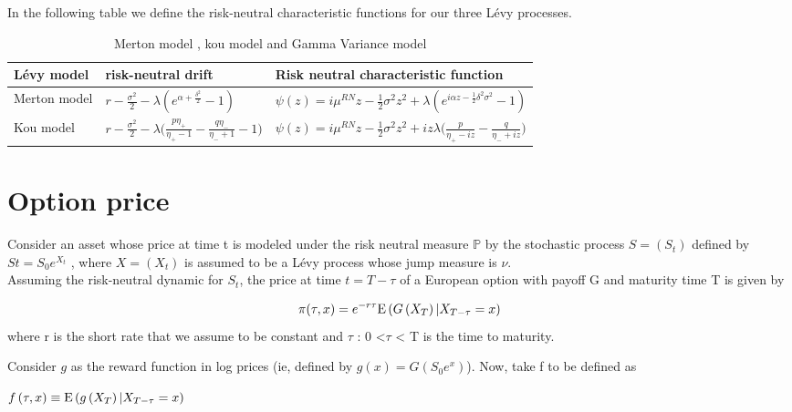 \documentclass[12pt]{report}
\begin{document}
In the following table we define the risk-neutral characteristic functions for our three Lévy processes.
\begin {table}[h!]
\begin{center}
\renewcommand{\arraystretch}{2}
\begin{tabular}{|l|l|l|}
 \hline
   Lévy model  & risk-neutral drift & Risk neutral characteristic function   \\
 \hline
Merton model  & $r-\frac{\sigma^2}{2}-\lambda (e^{\alpha+\frac{\delta^2}{2}}-1)$ & $\psi (z)= i\mu^{RN}z - \frac{1}{2}\sigma^2  z^2 + \lambda (e^{i \alpha z - \frac{1}{2} \delta ^2 \sigma^2}-1)$  \\
 \hline
 Kou model  & $r-\frac{\sigma^2}{2}-\lambda \big(\frac{p \eta_+}{\eta_+ -1}-\frac{q \eta_-}{\eta_- + 1}-1\big)$ & $\psi (z)= i\mu^{RN}z - \frac{1}{2}\sigma^2  z^2 + i z \lambda \big(\frac{p}{\eta_+- i z}- \frac{q}{\eta_- + i z}\big) $   \\

\hline
\end{tabular}
\end{center}
\caption{Merton model , kou model and Gamma Variance model} 
\end{table}
\section{Option price}
Consider an asset whose price at time t is modeled under the risk neutral measure $\mathbb{P}$ by the stochastic process $S = (S_t)$
defined by $St = S_0 e^{X_t}$ , where $X = (X_t)$  is assumed to be a Lévy process whose
jump measure is $\nu$.\\

Assuming the risk-neutral dynamic for $S_t$, the price at time $t = T-\tau$  of a European option with payoff G and maturity time T is given by

\begin{gather}
\pi(\tau,x)= e^{-r\tau} \mathrm{E} \left( {{G \left( {X_T} \right)|X_{T-\tau} = x}} \right)
\label{price}
\end{gather}
where r is the short rate that we assume to be constant and $\tau$ : 0 <$\tau$ < T is the time to
maturity.

Consider $g$ as the reward function in log prices (ie, defined by $g(x) = G(S_0e^x)$). Now, take f to be defined as
\begin{center}
$f \left( {\tau,x} \right) \equiv \mathrm{E} \left( {{g \left( {X_T} \right)|X_{T-\tau} = x}} \right)$
\end{center}
\end{document}
